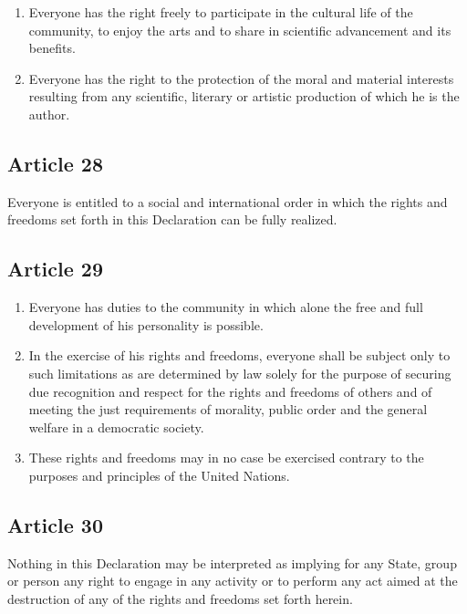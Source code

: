 \documentclass[
  ngerman,
  american,
  titlepage,
  openright,
  DIV=calc,
  toc=listof,
  listof=nochaptergap]{scrbook}
\begin{document}
\begin{enumerate}
\def\labelenumi{\arabic{enumi}.}
\item
  Everyone has the right freely to participate in the cultural life of
  the community, to enjoy the arts and to share in scientific
  advancement and its benefits.
\item
  Everyone has the right to the protection of the moral and material
  interests resulting from any scientific, literary or artistic
  production of which he is the author.
\end{enumerate}

\subsection{Article 28}\label{article-28-1}

Everyone is entitled to a social and international order in which the
rights and freedoms set forth in this Declaration can be fully realized.

\subsection{Article 29}\label{article-29-1}

\begin{enumerate}
\def\labelenumi{\arabic{enumi}.}
\item
  Everyone has duties to the community in which alone the free and full
  development of his personality is possible.
\item
  In the exercise of his rights and freedoms, everyone shall be subject
  only to such limitations as are determined by law solely for the
  purpose of securing due recognition and respect for the rights and
  freedoms of others and of meeting the just requirements of morality,
  public order and the general welfare in a democratic society.
\item
  These rights and freedoms may in no case be exercised contrary to the
  purposes and principles of the United Nations.
\end{enumerate}

\subsection{Article 30}\label{article-30-1}

Nothing in this Declaration may be interpreted as implying for any
State, group or person any right to engage in any activity or to perform
any act aimed at the destruction of any of the rights and freedoms set
forth herein.
\end{document}
